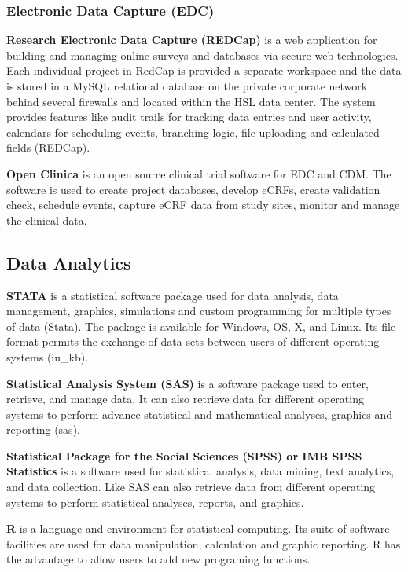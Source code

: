 \documentclass[]{book}
\begin{document}
\subsubsection{Electronic Data Capture
(EDC)}\label{electronic-data-capture-edc}

\textbf{Research Electronic Data Capture (REDCap)} is a web application
for building and managing online surveys and databases via secure web
technologies. Each individual project in RedCap is provided a separate
workspace and the data is stored in a MySQL relational database on the
private corporate network behind several firewalls and located within
the HSL data center. The system provides features like audit trails for
tracking data entries and user activity, calendars for scheduling
events, branching logic, file uploading and calculated fields (REDCap).

\textbf{Open Clinica} is an open source clinical trial software for EDC
and CDM. The software is used to create project databases, develop
eCRFs, create validation check, schedule events, capture eCRF data from
study sites, monitor and manage the clinical data.

\subsection{Data Analytics}\label{data-analytics}

\textbf{STATA} is a statistical software package used for data analysis,
data management, graphics, simulations and custom programming for
multiple types of data (Stata). The package is available for Windows,
OS, X, and Linux. Its file format permits the exchange of data sets
between users of different operating systems (iu\_kb).

\textbf{Statistical Analysis System (SAS)} is a software package used to
enter, retrieve, and manage data. It can also retrieve data for
different operating systems to perform advance statistical and
mathematical analyses, graphics and reporting (sas).

\textbf{Statistical Package for the Social Sciences (SPSS) or IMB SPSS
Statistics} is a software used for statistical analysis, data mining,
text analytics, and data collection. Like SAS can also retrieve data
from different operating systems to perform statistical analyses,
reports, and graphics.

\textbf{R} is a language and environment for statistical computing. Its
suite of software facilities are used for data manipulation, calculation
and graphic reporting. R has the advantage to allow users to add new
programing functions.
\end{document}
